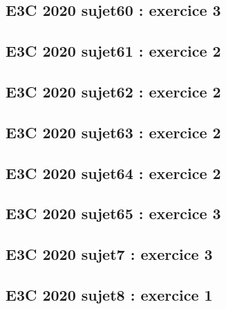 \documentclass[lang=fr,edition=teacher,layout=sheet]{mxbook}
\begin{document}
\par\bigskip
{}\subsection*{E3C 2020 sujet60 : exercice 3}
\begingroup\endgroup
\par\bigskip
{}\subsection*{E3C 2020 sujet61 : exercice 2}
\begingroup\endgroup
\par\bigskip
{}\subsection*{E3C 2020 sujet62 : exercice 2}
\begingroup\endgroup
\par\bigskip
{}\subsection*{E3C 2020 sujet63 : exercice 2}
\begingroup\endgroup
\par\bigskip
{}\subsection*{E3C 2020 sujet64 : exercice 2}
\begingroup\endgroup
\par\bigskip
{}\subsection*{E3C 2020 sujet65 : exercice 3}
\begingroup\endgroup
\par\bigskip
{}\subsection*{E3C 2020 sujet7 : exercice 3}
\begingroup\endgroup
\par\bigskip
{}\subsection*{E3C 2020 sujet8 : exercice 1}
\end{document}

